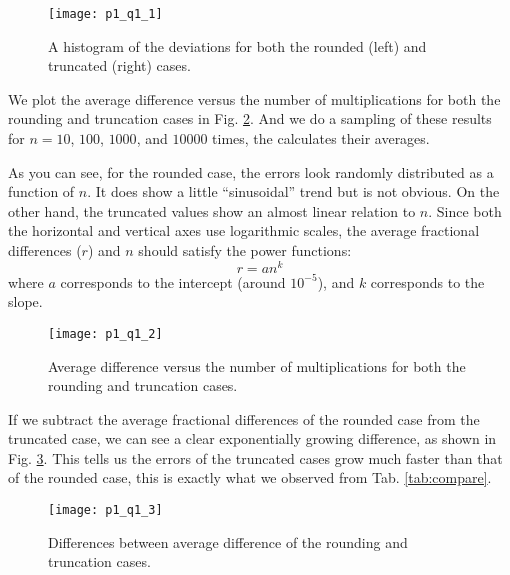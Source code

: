 \begin{figure}
    \centering
    \texttt{[image: p1\_q1\_1]}
    \caption{A histogram of the deviations for both the rounded (left) and
        truncated (right) cases.}
    \label{fig:histogram}
\end{figure}

We plot the average difference versus the number of multiplications for both the
rounding and truncation cases in Fig. \ref{fig:compare_rounding_truncation}.
And we do a sampling of these results for $n = 10$, $100$, $1000$, and $10000$ times,
the calculates their averages.

As you can see, for the rounded case, the errors look randomly distributed as a function
of $n$. It does show a little ``sinusoidal'' trend but is not obvious.
On the other hand, the truncated values show an almost linear relation to $n$.
Since both the horizontal and vertical axes use logarithmic scales, the average
fractional differences ($r$) and $n$ should satisfy the power functions:
%
\begin{equation}
    r = a n^k
\end{equation}
%
where $a$ corresponds to the intercept (around $10^{-5}$), and $k$ corresponds to the
slope.

\begin{figure}
    \centering
    \texttt{[image: p1\_q1\_2]}
    \caption{Average difference versus the number of multiplications for both
        the rounding and truncation cases.}
    \label{fig:compare_rounding_truncation}
\end{figure}

If we subtract the average fractional differences of the rounded case from the
truncated case, we can see a clear exponentially growing difference, as shown in
Fig. \ref{fig:diff_rounding_truncation}. This tells us the errors of the truncated
cases grow much faster than that of the rounded case, this is exactly what we observed
from Tab. \ref{tab:compare}.

\begin{figure}
    \centering
    \texttt{[image: p1\_q1\_3]}
    \caption{Differences between average difference of the rounding and truncation cases.}
    \label{fig:diff_rounding_truncation}
\end{figure}

